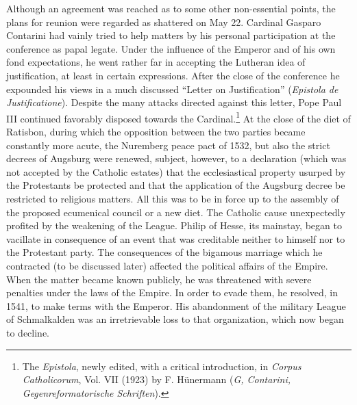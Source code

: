Although an agreement was reached as to some other non-essential
points, the plans for reunion were regarded as shattered on May 22.
Cardinal Gasparo Contarini had vainly tried to help matters by his
personal participation at the conference as papal legate. Under the
influence of the Emperor and of his own fond expectations, he went
rather far in accepting the Lutheran idea of justification, at least in
certain expressions. After the close of the conference he expounded
his views in a much discussed “Letter on Justification” (\textit{Epistola de
Justificatione}). Despite the many attacks directed against this letter,
Pope Paul III continued favorably disposed towards the Cardinal.\footnote
{The \textit{Epistola}, newly edited, with a critical introduction, in \textit{Corpus Catholicorum}, Vol.
VII (1923) by F. Hünermann (\textit{G, Contarini, Gegenreformatorische Schriften}).}
At the close of the diet of Ratisbon, during which the opposition
between the two parties became constantly more acute, the Nuremberg peace
pact of 1532, but also the strict decrees of Augsburg were
renewed, subject, however, to a declaration (which was not accepted
by the Catholic estates) that the ecclesiastical property usurped by
the Protestants be protected and that the application of the Augsburg
decree be restricted to religious matters. All this was to be in force up
to the assembly of the proposed ecumenical council or a new diet.
The Catholic cause unexpectedly profited by the weakening of the
League. Philip of Hesse, its mainstay, began to vacillate in consequence
of an event that was creditable neither to himself nor to the
Protestant party. The consequences of the bigamous marriage which
he contracted (to be discussed later) affected the political affairs of
the Empire. When the matter became known publicly, he was threatened with
severe penalties under the laws of the Empire. In order
to evade them, he resolved, in 1541, to make terms with the Emperor.
His abandonment of the military League of Schmalkalden was an
irretrievable loss to that organization, which now began to decline.
